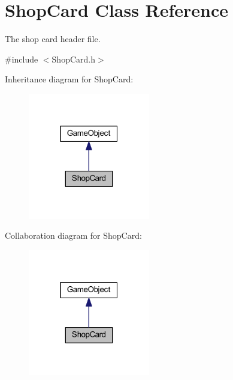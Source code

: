 \hypertarget{class_shop_card}{\section{Shop\+Card Class Reference}
\label{class_shop_card}
}


The shop card header file.  




{\ttfamily \#include $<$Shop\+Card.\+h$>$}



Inheritance diagram for Shop\+Card\+:\nopagebreak
\begin{figure}[H]
\begin{center}
\leavevmode
\includegraphics[width=151pt]{class_shop_card__inherit__graph}
\end{center}
\end{figure}


Collaboration diagram for Shop\+Card\+:\nopagebreak
\begin{figure}[H]
\begin{center}
\leavevmode
\includegraphics[width=151pt]{class_shop_card__coll__graph}
\end{center}
\end{figure}
